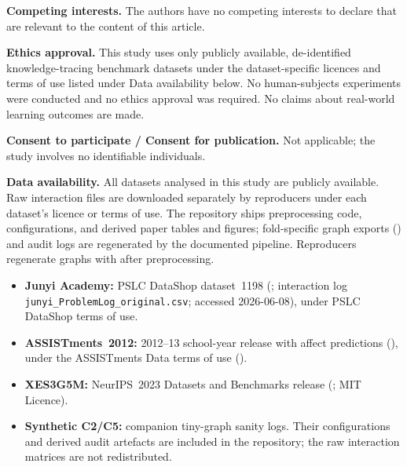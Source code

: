\documentclass[pdflatex,sn-mathphys-num]{sn-jnl}
\begin{document}
\medskip\noindent\textbf{Competing interests.} The authors have no competing
interests to declare that are relevant to the content of this article.

\medskip\noindent\textbf{Ethics approval.} This study uses only publicly
available, de-identified knowledge-tracing benchmark datasets under the
dataset-specific licences and terms of use listed under Data availability
below. No human-subjects experiments were conducted and no ethics approval was
required. No claims about real-world learning outcomes are made.

\medskip\noindent\textbf{Consent to participate / Consent for publication.} Not
applicable; the study involves no identifiable individuals.

\medskip\noindent\textbf{Data availability.} All datasets analysed in this study
are publicly available. Raw interaction files are downloaded separately by
reproducers under each dataset's licence or terms of use. The repository ships
preprocessing code, configurations, and derived paper tables and figures;
fold-specific graph exports () and audit logs are
regenerated by the documented pipeline. Reproducers regenerate graphs with
 after preprocessing.
\begin{itemize}
  \item \textbf{Junyi Academy:} PSLC DataShop dataset~1198
  (;
  interaction log \texttt{junyi\_ProblemLog\_original.csv}; accessed
  2026-06-08), under PSLC DataShop terms of use.
  \item \textbf{ASSISTments~2012:} 2012--13 school-year release with affect
  predictions
  (),
  under the ASSISTments Data terms of use
  ().
  \item \textbf{XES3G5M:} NeurIPS~2023 Datasets and Benchmarks release
  (; MIT Licence).
  \item \textbf{Synthetic C2/C5:} companion tiny-graph sanity logs. Their
  configurations and derived audit artefacts are included in the repository;
  the raw interaction matrices are not redistributed.
\end{itemize}
\end{document}
